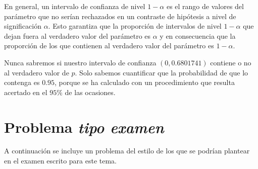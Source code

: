 \documentclass[
  notoc,
  nobib,
  degree=mec]{mnye}
\begin{document}
En general, un intervalo de confianza de nivel \(1-\alpha\) es el rango de valores del parámetro que no serían rechazados en un contraste de hipótesis a nivel de significación \(\alpha\). Esto garantiza que la proporción de intervalos de nivel \(1-\alpha\) que dejan fuera al verdadero valor del parámetro es \(\alpha\) y en consecuencia que la proporción de los que contienen al verdadero valor del parámetro es \(1-\alpha\).

Nunca sabremos si nuestro intervalo de confianza \((0, 0.6801741)\) contiene o no al verdadero valor de \(p\). Solo sabemos cuantificar que la probabilidad de que lo contenga es \(0.95\), porque se ha calculado con un procedimiento que resulta acertado en el \(95\%\) de las ocasiones.

\nocite{Milton2003}
\nocite{Montgomery2010}

\makeatletter
\renewcommand{\mybibnote@contents}{%
Para ampliar conocimientos de este tema puedes consultar los Capítulos 6, 7, 8 y 9   de  \cite{Milton2003} y los Capítulos 6, 7, 8 y 9 de \cite{Montgomery2010}. 
}
\makeatother

\hypertarget{problema-tipo-examen}{%
\section*{\texorpdfstring{Problema \emph{tipo examen}}{Problema tipo examen}}\label{problema-tipo-examen}}

A continuación se incluye un problema del estilo de los que se podrían plantear en el examen escrito para este tema.
\end{document}
